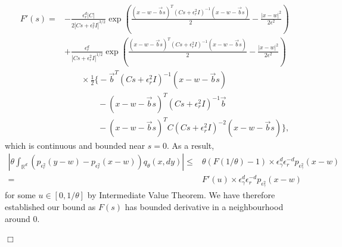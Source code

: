 \documentclass[12pt]{article}
\newenvironment {proof}{{\noindent\bf Proof }}{\hfill $\Box$ \medskip}
\newcommand{\meanq}{\vec b}    %
\newcommand{\covq}{C}     %
\begin{document}
\begin{proof}
\begin{align}
F'(s)=&  -\frac{\epsilon^d_r |\covq|}
        {2\left|\covq s +  \epsilon^2_r I \right|^{3/2}}
        \exp \left(
                    \frac{(x-w-\meanq s)^{T}
                        (\covq s +  \epsilon^2_r I)^{-1}
                        (x-w-\meanq s)}{2}
                        -\frac{|x-w|^2}{2\epsilon^2}
            \right)\\
    &+\frac{\epsilon^d_r }
        {\left|\covq s +  \epsilon^2_r I \right|^{1/2}}
        \exp \left(
                    \frac{(x-w-\meanq s)^{T}
                        (\covq s +  \epsilon^2_r I)^{-1}
                        (x-w-\meanq s)}{2}
                        -\frac{|x-w|^2}{2\epsilon^2}
            \right) \\
    & \qquad \times \frac{1}{2}
                    \bigg\{
                         -\meanq^{T}(\covq s + \epsilon^2_r I)^{-1}(x-w-\meanq s)\\
    & \qquad \qquad     -(x-w-\meanq s)^{T}
                        (\covq s +  \epsilon^2_r I)^{-1}\meanq\\
    & \qquad \qquad     -(x-w-\meanq s)^{T}
                        \covq(\covq s +  \epsilon^2_r I)^{-2}(x-w-\meanq s)                    
                    \bigg\},
\end{align}
which is continuous and bounded near $s=0$.
As a result,
\begin{align}
\left| \theta \int_{\mathbb{R}^d}
                \left(p_{\epsilon^2_r}(y-w)
                        -p_{\epsilon^2_r}(x-w)
                \right)
                q_\theta(x,dy)
        \right|
        \leq&  \theta \left(F\left(1 / \theta \right)-1\right) 
                \times \epsilon_\gamma^d \epsilon_r^{-d}
                p_{\epsilon^2_\gamma}(x-w)\\
         =&  F'(u) 
                \times \epsilon_\gamma^d \epsilon_r^{-d}
                p_{\epsilon^2_\gamma}(x-w)        
\end{align}
for some $u \in [0, 1/\theta]$ by Intermediate Value Theorem. We have therefore established our bound as $F(s)$ has bounded derivative in a neighbourhood around $0$.


\end{proof}
\end{document}
